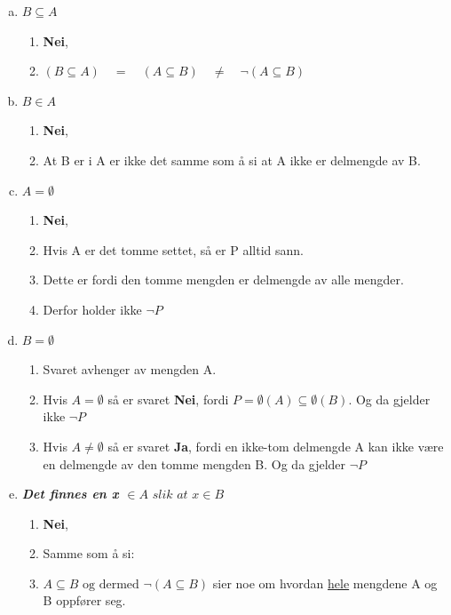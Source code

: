 \documentclass{article}
\begin{document}
\begin{enumerate}[(a)]
    \item \textbf{\(B \subseteq A\)}
    \begin{enumerate}[-]
        \item \textbf{Nei},
        \item \( (B \subseteq A) \quad = \quad (A \subseteq B) \quad \neq \quad \neg (A \subseteq B)\)
    \end{enumerate}
    \item \textbf{\(B \in A\)}
    \begin{enumerate}[-]
        \item \textbf{Nei},
        \item At B er i A er ikke det samme som å si at A ikke er delmengde av B.
    \end{enumerate}
    \item \textbf{\(A = \emptyset\)}
    \begin{enumerate}[-]
        \item \textbf{Nei}, 
        \item Hvis A er det tomme settet, så er P alltid sann.
        \item Dette er fordi den tomme mengden er delmengde av alle mengder.
        \item Derfor holder ikke \(\neg P\)
    \end{enumerate}
    \item \textbf{\(B = \emptyset\)}
    \begin{enumerate}[-]
        \item Svaret avhenger av mengden A.
        \item Hvis \(A = \emptyset\) så er svaret \textbf{Nei}, fordi \(P = \emptyset (A) \subseteq \emptyset(B)\). Og da gjelder ikke \(\neg P\)
        \item Hvis \(A \neq \emptyset\) så er svaret \textbf{Ja}, fordi en ikke-tom delmengde A kan ikke være en delmengde av den tomme mengden B. Og da gjelder \(\neg P\)
    \end{enumerate}
    \newpage
    \item \textbf{\textit{Det finnes en x $\in A \textit{ slik at } x \in B$}}
    \begin{enumerate}[-]
        \item \textbf{Nei},
        \item Samme som å si: 
        \item \(A \subseteq B \text{ og dermed } \neg (A \subseteq B)\) sier noe om hvordan \underline{hele} mengdene A og B oppfører seg.

\end{enumerate}
\end{enumerate}
\end{document}
